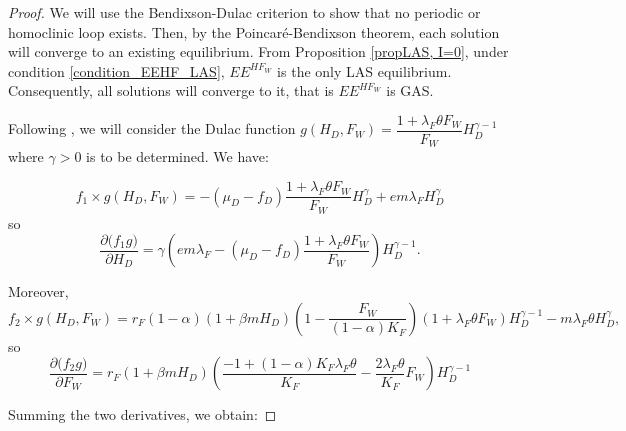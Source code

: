 \documentclass{article}
\newcommand{\lfw}{\lambda_{F}}
\newcommand{\lfw}{\lambda_{F}}
\begin{document}
\begin{proof}
We will use the Bendixson-Dulac criterion to show that no periodic or homoclinic loop exists. Then, by the Poincaré-Bendixson theorem, each solution will converge to an existing equilibrium. From Proposition \ref{propLAS, I=0}, under condition \eqref{condition_EEHF_LAS}, $EE^{HF_W}$ is the only LAS equilibrium. Consequently, all solutions will converge to it, that is $EE^{HF_W}$ is GAS.

Following \cite{hsu_competing_1978}, we will consider the Dulac function $g(H_D, F_W) = \dfrac{1 + \lfw \theta F_W }{F_W} H_D^{\gamma - 1}$ where $\gamma > 0$ is to be determined. We have:

\begin{equation*}
f_1 \times g(H_D, F_W) = -(\mu_D - f_D) \dfrac{1 + \lfw \theta F_W}{F_W}H_D^\gamma + e m \lfw H_D ^\gamma
\end{equation*}
so
\begin{equation*}
\dfrac{\partial \Big(f_1 g \Big)}{\partial H_D} = \gamma \left(e m \lfw - (\mu_D - f_D) \dfrac{1 + \lfw \theta F_W}{F_W} \right) H_D^{\gamma-1}.
\end{equation*}

Moreover,
\begin{equation*}
f_2 \times g(H_D, F_W) = r_F(1-\alpha) (1 + \beta m H_D) \left(1 - \dfrac{F_W}{(1-\alpha)K_F}\right)(1+\lfw \theta F_W) H_D^{\gamma - 1} - m \lfw \theta H_D^\gamma,
\end{equation*}
so
\begin{equation*}
\dfrac{\partial \Big(f_2 g \Big)}{\partial F_W} = r_F (1 + \beta m H_D) \left(\dfrac{-1 + (1-\alpha)K_F \lfw \theta}{K_F}-  \dfrac{2 \lfw \theta}{K_F} F_W\right) H_D^{\gamma - 1}
\end{equation*}

Summing the two derivatives, we obtain:


\end{proof}
\end{document}
